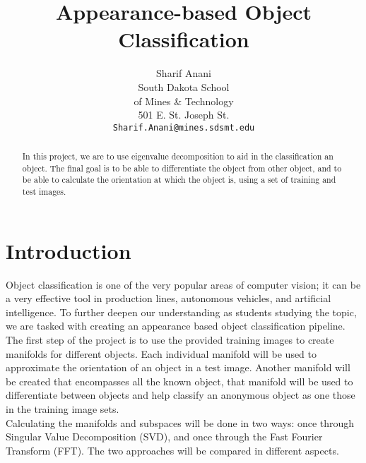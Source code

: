 \documentclass[10pt,twocolumn,letterpaper]{article}
\begin{document}
\title{Appearance-based Object Classification}

\author{Sharif Anani\\
South Dakota School\\
of Mines \& Technology\\
501 E. St. Joseph St.\\
{\tt\small Sharif.Anani@mines.sdsmt.edu}
}

\maketitle


\begin{abstract}
   In this project, we are to use eigenvalue decomposition to aid in the classification an object. The final goal is to be able to differentiate the object from other object, and to be able to calculate the orientation at which the object is, using a set of training and test images.
\end{abstract}

\section{Introduction}
Object classification is one of the very popular areas of computer vision; it can be a very effective tool in production lines, autonomous vehicles, and artificial intelligence. To further deepen our understanding as students studying the topic, we are tasked with creating an appearance based object classification pipeline.\\
The first step of the project is to use the provided training images to create manifolds for different objects. Each individual manifold will be used to approximate the orientation of an object in a test image. Another manifold will be created that encompasses all the known object, that manifold will be used to differentiate between objects and help classify an anonymous object as one those in the training image sets.\\
Calculating the manifolds and subspaces will be done in two ways: once through Singular Value Decomposition (SVD), and once through the Fast Fourier Transform (FFT). The two approaches will be compared in different aspects.
\end{document}
